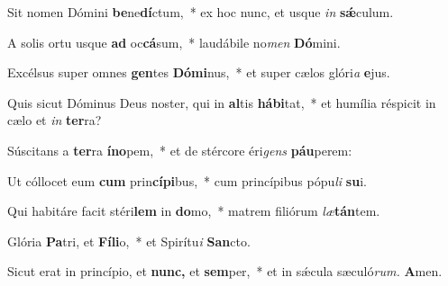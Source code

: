 \item Sit nomen Dómini \textbf{be}ne\textbf{dí}ctum,~* ex hoc nunc, et usque \textit{in} \textbf{sǽ}culum.
\item A solis ortu usque \textbf{ad} oc\textbf{cá}sum,~* laudábile no\textit{men} \textbf{Dó}mini.
\item Excélsus super omnes \textbf{gen}tes \textbf{Dó}\textbf{mi}nus,~* et super cælos glóri\hspace*{0.03em}\textit{a} \textbf{e}jus.
\item Quis sicut Dóminus Deus noster, qui in \textbf{al}tis \textbf{há}\textbf{bi}tat,~* et humília réspicit in cælo et \textit{in} \textbf{ter}ra?
\item Súscitans a \textbf{ter}ra \textbf{ín}\textbf{o}pem,~* et de stércore éri\hspace*{0.01em}\textit{gens} \textbf{páu}perem:
\item Ut cóllocet eum \textbf{cum} prin\textbf{cí}\textbf{pi}bus,~* cum princípibus pópu\hspace*{0.03em}\textit{li} \textbf{su}i.
\item Qui habitáre facit stéri\textbf{lem} in \textbf{do}mo,~* matrem filiórum \textit{læ}\textbf{tán}tem.
\item Glória \textbf{Pa}tri, et \textbf{Fí}\textbf{li}o,~* et Spirítu\hspace*{0.01em}\textit{i} \textbf{San}cto.
\item Sicut erat in princípio, et \textbf{nunc,} et \textbf{sem}per,~* et in sǽcula sæculó\textit{rum.} \textbf{A}men.